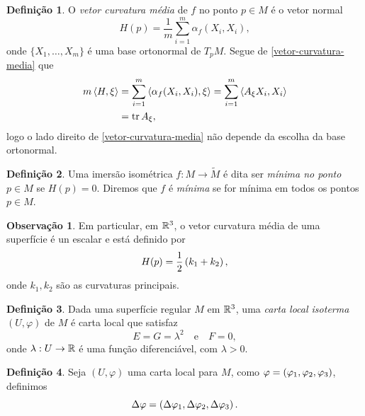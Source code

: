 \documentclass[12pt,a4paper]{beamer}
\theoremstyle{definition}
\newtheorem{definicao}{Definição}
\newtheorem{observacao}{Observação}
\begin{document}
\begin{frame}
	\begin{definicao}
		O \emph{vetor curvatura média} de $f$ no ponto $p \in M$ é o vetor normal
		\begin{equation}\label{vetor-curvatura-media}
			H(p) = \frac{1}{m} \sum_{i=1}^m \alpha_f(X_i,X_i),
		\end{equation}
		onde $\{X_1, \ldots, X_m \}$ é uma base ortonormal de $T_p M$. Segue de \eqref{vetor-curvatura-media} que
		\begin{align*}
			m \left\langle H,\xi \right\rangle &= \sum_{i=1}^m \left\langle \alpha_f(X_i,X_i),\xi \right\rangle = \sum_{i=1}^m \left\langle A_{\xi} X_i,X_i \right\rangle\\
			&= \operatorname{tr} A_{\xi},
		\end{align*}
		logo o lado direito de \eqref{vetor-curvatura-media} não depende da escolha da base ortonormal.
	\end{definicao}
\end{frame}

\begin{frame}
	\begin{definicao}
		Uma imersão isométrica $f: M \rightarrow \tilde{M}$ é dita ser \emph{mínima no ponto} $p \in M$ se $H(p)=0$. Diremos que $f$ é \emph{mínima} se for mínima em todos os pontos $p \in M$.
	\end{definicao}

	\begin{observacao}
		Em particular, em $\mathbb R^3$, o vetor curvatura média de uma superfície é un escalar e está definido por
		\begin{equation*}
			H(p) = \frac{1}{2} \left( k_1 + k_2 \right),
		\end{equation*}
		onde $k_1,k_2$ são as curvaturas principais.
	\end{observacao}
\end{frame}

\begin{frame}
	\begin{definicao}
		Dada uma superfície regular $M$ em $\mathbb R^3$, uma \emph{carta local isoterma} $(U, \varphi)$ de $M$ é carta local que satisfaz
		\begin{equation*}
			E = G = \lambda^2 \quad \text{e} \quad F=0,
		\end{equation*}
		onde $\lambda: U \rightarrow \mathbb R$ é uma função diferenciável, com $\lambda > 0$.
	\end{definicao}
	
	\begin{definicao}
		Seja $(U, \varphi)$ uma carta local para $M$, como $\varphi = \left( \varphi_1, \varphi_2, \varphi_3 \right)$, definimos
		\begin{equation*}
			\Delta \varphi = \left( \Delta \varphi_1, \Delta \varphi_2, \Delta \varphi_3 \right).
		\end{equation*}
	\end{definicao}
	
\end{frame}
\end{document}
